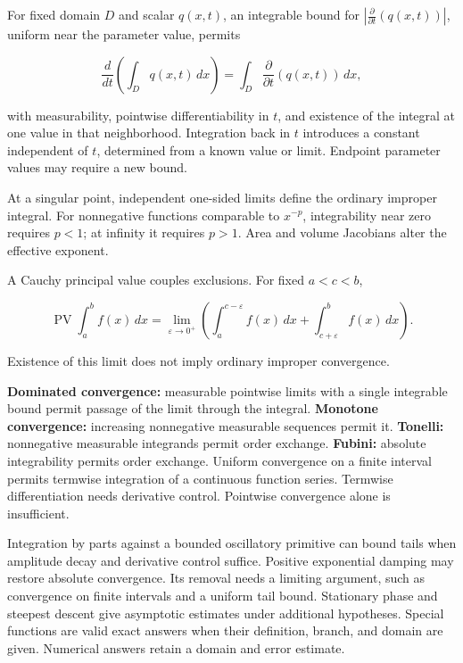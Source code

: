 \documentclass[11pt,oneside,openany]{book}
\begin{document}
\hfill%
\begin{minipage}[t]{0.485\textwidth}\vspace{0pt}

For fixed domain \(D\) and scalar \(q(x,t)\), an integrable bound for
\(|\frac{\partial}{\partial t}(q(x,t))|\), uniform near the parameter value,
permits

\[
\frac{d}{dt}\left(\int_Dq(x,t)\,dx\right)
=\int_D\frac{\partial}{\partial t}(q(x,t))\,dx,
\]

with measurability, pointwise differentiability in \(t\), and existence of the
integral at one value in that neighborhood. Integration back in \(t\) introduces a constant
independent of \(t\), determined from a known value or limit. Endpoint parameter
values may require a new bound.


At a singular point, independent one-sided limits define the ordinary improper
integral. For nonnegative functions comparable to \(x^{-p}\), integrability near
zero requires \(p<1\); at infinity it requires \(p>1\). Area and volume Jacobians
alter the effective exponent.

A Cauchy principal value couples exclusions. For fixed \(a<c<b\),

\[
\operatorname{PV}\int_a^b f(x)\,dx
=\lim_{\varepsilon\to0^+}\left(
\int_a^{c-\varepsilon}f(x)\,dx+\int_{c+\varepsilon}^b f(x)\,dx\right).
\]

Existence of this limit does not imply ordinary improper convergence.


\textbf{Dominated convergence:} measurable pointwise limits with a single
integrable bound permit passage of the limit through the integral.
\textbf{Monotone convergence:} increasing nonnegative measurable sequences permit it.
\textbf{Tonelli:} nonnegative measurable integrands permit order exchange.
\textbf{Fubini:} absolute integrability permits order exchange.
Uniform convergence on a finite interval permits termwise integration of a
continuous function series. Termwise differentiation needs derivative control.
Pointwise convergence alone is insufficient.


Integration by parts against a bounded oscillatory primitive can bound tails
when amplitude decay and derivative control suffice. Positive exponential
damping may restore absolute convergence. Its removal needs a limiting argument,
such as convergence on finite intervals and a uniform tail bound.
Stationary phase and steepest descent give asymptotic estimates under additional
hypotheses. Special functions are valid exact answers when their definition,
branch, and domain are given. Numerical answers retain a domain and error estimate.
\end{minipage}
\end{document}
